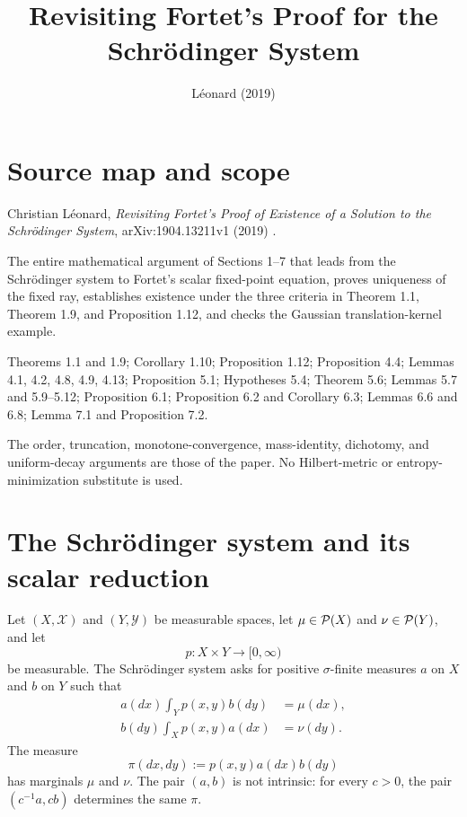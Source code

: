 
\title{Revisiting Fortet's Proof for the Schr\"odinger System}
\author{}
\date{L\'eonard (2019)}

\maketitle

\section*{Source map and scope}
\begin{sourceguide}
\item[Primary source] Christian L\'eonard, \emph{Revisiting Fortet's Proof of Existence of a Solution to the Schr\"odinger System}, arXiv:1904.13211v1 (2019) \cite{Leonard2019}.
\item[Coverage] The entire mathematical argument of Sections 1--7 that leads from the Schr\"odinger system to Fortet's scalar fixed-point equation, proves uniqueness of the fixed ray, establishes existence under the three criteria in Theorem 1.1, Theorem 1.9, and Proposition 1.12, and checks the Gaussian translation-kernel example.
\item[Source anchors] Theorems 1.1 and 1.9; Corollary 1.10; Proposition 1.12; Proposition 4.4; Lemmas 4.1, 4.2, 4.8, 4.9, 4.13; Proposition 5.1; Hypotheses 5.4; Theorem 5.6; Lemmas 5.7 and 5.9--5.12; Proposition 6.1; Proposition 6.2 and Corollary 6.3; Lemmas 6.6 and 6.8; Lemma 7.1 and Proposition 7.2.
\item[Method] The order, truncation, monotone-convergence, mass-identity, dichotomy, and uniform-decay arguments are those of the paper.  No Hilbert-metric or entropy-minimization substitute is used.
\end{sourceguide}

\section{The Schr\"odinger system and its scalar reduction}
Let $(X,\mathcal X)$ and $(Y,\mathcal Y)$ be measurable spaces, let $\mu\in\mathcal{P}(X)$ and $\nu\in\mathcal{P}(Y)$, and let
\[
 p:X\times Y\longrightarrow[0,\infty)
\]
be measurable.  The Schr\"odinger system asks for positive $\sigma$-finite measures $a$ on $X$ and $b$ on $Y$ such that
\begin{align}
 a(dx)\int_Y p(x,y)b(dy)&=\mu(dx),\label{eq:L19-system-x}\\
 b(dy)\int_X p(x,y)a(dx)&=\nu(dy).\label{eq:L19-system-y}
\end{align}
The measure
\[
 \pi(dx,dy):=p(x,y)a(dx)b(dy)
\]
has marginals $\mu$ and $\nu$.  The pair $(a,b)$ is not intrinsic: for every $c>0$, the pair $(c^{-1}a,cb)$ determines the same $\pi$.

